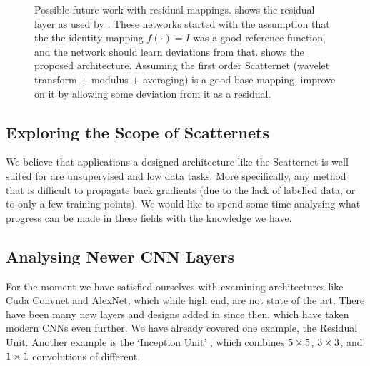   \begin{figure}
    \caption[Possible future work with residual mappings]
            {Possible future work with residual mappings.
             shows the residual layer as used by
            \citep{he_deep_2015}. These networks started with the assumption
            that the the identity mapping $f(\cdot) = I$ was a good reference
            function, and the network should learn deviations from that.
             shows the proposed architecture. Assuming
            the first order Scatternet (wavelet transform + modulus + averaging) is a good
            base mapping, improve on it by allowing some deviation from it as
            a residual.}
    \label{fig:improved_design}
  \end{figure}

\subsection{Exploring the Scope of Scatternets}\label{sec:scat_scope}
  We believe that applications a designed architecture like the
  Scatternet is well suited for are unsupervised and low data tasks.
  More specifically, any method that is difficult to propagate back gradients
  (due to the lack of labelled data, or to only a few training points). We
  would like to spend some time analysing what progress can be made in these
  fields with the knowledge we have.

\subsection{Analysing Newer CNN Layers}\label{sec:new_cnn_layers}
  For the moment we have satisfied ourselves with examining architectures like
  Cuda Convnet and AlexNet, which while high end, are not state of the art.
  There have been many new layers and designs added in since then, which have
  taken modern CNNs even further. We have already covered one example, the
  Residual Unit. Another example is the `Inception Unit'
  \citep{szegedy_going_2015,szegedy_rethinking_2015}, which combines
  $5\times 5$, $3\times 3$, and $1\times 1$ convolutions of different.

